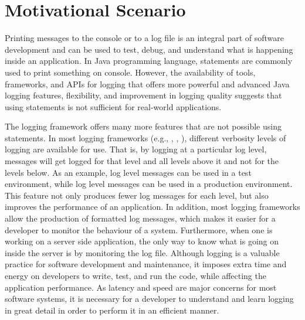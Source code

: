 \chapter{Motivational Scenario}  \label{ch2}

Printing messages to the console or to a log file is an integral part of software development and can be used to test, debug, and understand what is happening inside an application. In Java programming language,  statements
are commonly used to print something on console. However, the availability of tools, frameworks, and APIs for logging that offers more powerful and advanced Java logging features, flexibility, and improvement in logging quality suggests that using  statements is not sufficient for real-world applications.

The logging framework offers many more features that are not possible using  statements. In most logging frameworks (e.g., , , ), different verbosity levels of logging are available for use. That is, by logging at a particular log level, messages will get logged for that level and all levels above it and not for the levels below. As an example,  log level messages can be used in a test environment, while  log level messages can be used in a production environment. This feature not only produces fewer log messages for each level, but also improves the performance of an application. In addition, most logging frameworks allow the production of formatted log messages, which makes it easier for a developer to monitor the behaviour of a system. Furthermore, when one is working on a server side application, the only way to know what is going on inside the server is by monitoring the log file. Although logging is a valuable practice for software development and maintenance, it imposes extra time and energy on developers to write, test, and run the code, while affecting the application performance. As latency and speed are major concerns for most software systems, it is necessary  for a developer to understand and learn logging in great detail in order to perform it in an efficient manner.


